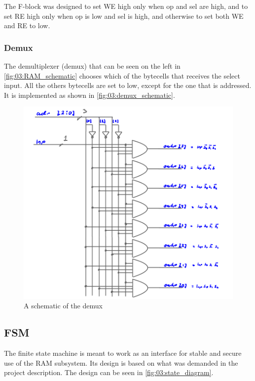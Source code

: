 The F-block was designed to set WE high only when op and sel are high, and to set RE high only when op is low and sel is high, and otherwise to set both WE and RE to low.

\subsubsection{Demux}
The demultiplexer (demux) that can be seen on the left in \autoref{fig:03:RAM_schematic} chooses which of the bytecells that receives the select input. All the others bytecells are set to low, except for the one that is addressed. It is implemented as shown in \autoref{fig:03:demux_schematic}.

\begin{figure}[H]
    \centering
    \includegraphics[width=0.75\linewidth]{LaTeX_2/Figures/demux1to8_schematic.png}
    \caption{A schematic of the demux}
    \label{fig:03:demux_schematic}
\end{figure}

\subsection{FSM}
The finite state machine is meant to work as an interface for stable and secure use of the RAM subsystem. Its design is based on what was demanded in the project description. The design can be seen in \autoref{fig:03:state_diagram}. 


